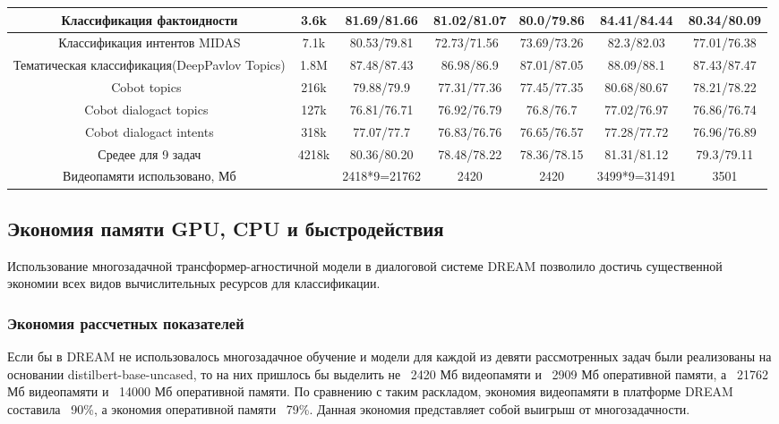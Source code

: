 \begin{table}[htbp]
{\begin{tabular}{|c||c|c|c|c|c|c|}
Классификация фактоидности                      & 3.6k  & 81.69/81.66  & 81.02/81.07  & 80.0/79.86                   & 84.41/84.44  & 80.34/80.09 \\ \hline
Классификация интентов MIDAS                    & 7.1k  & 80.53/79.81  & 72.73/71.56~ & 73.69/73.26 & 82.3/82.03   & 77.01/76.38 \\ \hline
Тематическая классификация(DeepPavlov Topics) & 1.8M  & 87.48/87.43  & 86.98/86.9   & 87.01/87.05                  & 88.09/88.1   & 87.43/87.47 \\ \hline
Cobot topics~                                   & 216k  & 79.88/79.9   & 77.31/77.36  & 77.45/77.35                  & 80.68/80.67  & 78.21/78.22 \\ \hline
Cobot dialogact topics~                         & 127k  & 76.81/76.71  & 76.92/76.79  & 76.8/76.7                    & 77.02/76.97  & 76.86/76.74 \\ \hline
Cobot dialogact intents                         & 318k  & 77.07/77.7   & 76.83/76.76  & 76.65/76.57                  & 77.28/77.72  & 76.96/76.89 \\ \hline
Средее для 9 задач                                     & 4218k & 80.36/80.20       & 78.48/78.22  & 78.36/78.15                  & 81.31/81.12    & 79.3/79.11  \\ \hline
Видеопамяти использовано, Мб                             &       & 2418*9=21762 & 2420         & 2420                         & 3499*9=31491 & 3501        \\ \hline
\end{tabular}
}
\end{table}

\subsection{Экономия памяти GPU, CPU и быстродействия} 
\label{economy}
Использование многозадачной трансформер-агностичной модели в диалоговой системе {DREAM} позволило достичь существенной экономии всех видов вычислительных ресурсов для классификации.
\subsubsection{Экономия рассчетных показателей} 
\label{economy_predicted} 
 Если бы в {DREAM} не использовалось многозадачное обучение и модели для каждой из девяти рассмотренных задач были реализованы на основании  distilbert-base-uncased, то на них пришлось бы выделить не ~2420 Мб видеопамяти и ~2909 Мб оперативной памяти, а ~21762 Мб видеопамяти и ~14000 Мб оперативной памяти. По сравнению с таким раскладом, экономия видеопамяти в платформе {DREAM} составила ~90\%, а экономия оперативной памяти ~79\%. Данная экономия представляет собой выигрыш от многозадачности.


